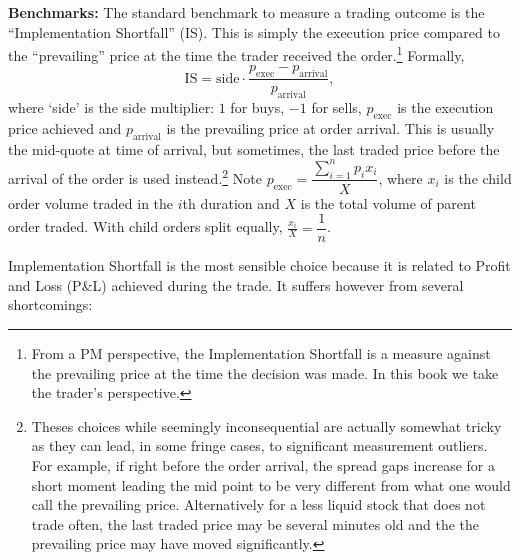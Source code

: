 \noindent\textbf{Benchmarks:} The standard benchmark to measure a trading outcome is the ``Implementation Shortfall'' (IS).\label{in:shortfall} This is simply the execution price compared to the ``prevailing'' price at the time the trader received the order.\footnote{From a PM perspective, the Implementation Shortfall is a measure against the prevailing price at the time the decision was made. In this book we take the trader's perspective.} Formally,
        \begin{equation}
        \text{IS} = \text{side} \cdot \frac{p_{\text{exec}} - p_{\text{arrival}}}{p_{\text{arrival}}},
        \end{equation}
where `side' is the side multiplier: $1$ for buys, $-1$ for sells, $p_{\text{exec}}$ is the execution price achieved and $p_{\text{arrival}}$ is the prevailing price at order arrival. This is usually the mid-quote at time of arrival, but sometimes, the last traded price before the arrival of the order is used instead.\footnote{Theses choices while seemingly inconsequential are actually somewhat tricky as they can lead, in some fringe cases, to significant measurement outliers. For example, if right before the order arrival, the spread gaps increase for a short moment leading the mid point to be very different from what one would call the prevailing price. Alternatively for a less liquid stock that does not trade often, the last traded price may be several minutes old and the the prevailing price may have moved significantly.} Note $p_\text{exec}= \dfrac{\sum_{i=1}^n p_i x_i}{X}$, where $x_i$ is the child order volume traded in the $i$th duration and $X$ is the total volume of parent order traded. With child orders split equally, $\frac{x_i}{X}= \dfrac{1}{n}$.


Implementation Shortfall is the most sensible choice because it is related to Profit and Loss (P\&L) achieved during the trade.  It suffers however from several shortcomings:


